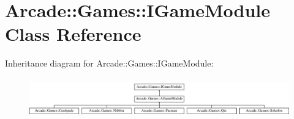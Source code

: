 \hypertarget{classArcade_1_1Games_1_1IGameModule}{}\section{Arcade\+::Games\+::I\+Game\+Module Class Reference}
\label{classArcade_1_1Games_1_1IGameModule}
Inheritance diagram for Arcade\+::Games\+::I\+Game\+Module\+:\begin{figure}[H]
\begin{center}
\leavevmode
\includegraphics[height=1.723077cm]{classArcade_1_1Games_1_1IGameModule}
\end{center}
\end{figure}
